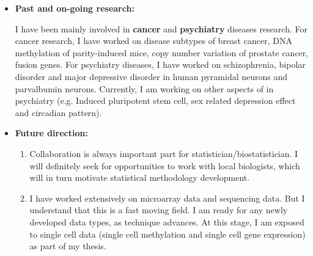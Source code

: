 \documentclass[a4paper, 10pt]{article}
\begin{document}
\begin{itemize}
\item \textbf{Past and on-going research:}

I have been mainly involved in \textbf{cancer} and \textbf{psychiatry} diseases research.
For cancer research, I have worked on disease subtypes of breast cancer\cite{ref:ILC},
DNA methylation of parity-induced mice\cite{ref:mouseParity}, 
copy number variation of prostate cancer\cite{ref:prostate},
fusion genes\cite{ref:fusionGene}.
For psychiatry diseases,
I have worked on schizophrenia, bipolar disorder and major depressive disorder in human pyramidal neurons\cite{ref:MO1} and parvalbumin neurons\cite{ref:PVL3}.
Currently, I am working on other aspects of in psychiatry (e.g. Induced pluripotent stem cell, sex related depression effect and circadian pattern).

\item \textbf{Future direction:}
\begin{enumerate}
\item Collaboration is always important part for statistician/biostatistician.
I will definitely seek for opportunities to work with local biologists, which will in turn motivate statistical methodology development.
\item I have worked extensively on microarray data and sequencing data.
But I understand that this is a fast moving field.
I am ready for any newly developed data types, as technique advances.
At this stage, I am exposed to single cell data (single cell methylation and single cell gene expression) as part of my thesis.
\end{enumerate}
\end{itemize}
\end{document}
